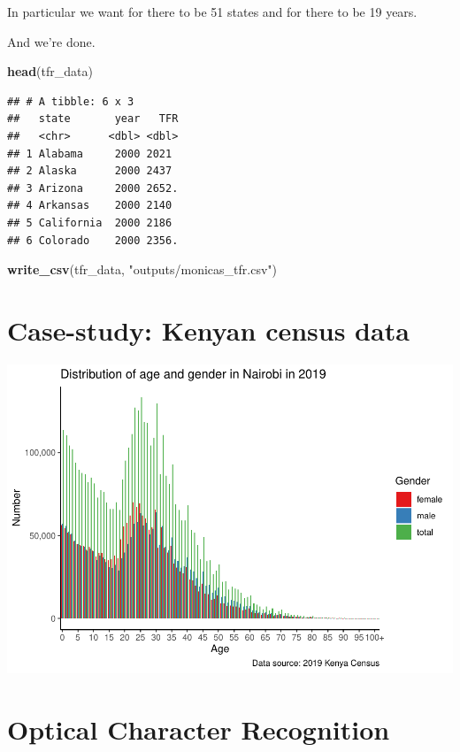 \documentclass[
]{book}
\newenvironment{Shaded}{\begin{snugshade}}{\end{snugshade}}
\newcommand{\KeywordTok}[1]{\textcolor[rgb]{0.13,0.29,0.53}{\textbf{#1}}}
\newcommand{\NormalTok}[1]{#1}
\newcommand{\StringTok}[1]{\textcolor[rgb]{0.31,0.60,0.02}{#1}}
\begin{document}
In particular we want for there to be 51 states and for there to be 19 years.

And we're done.

\begin{Shaded}
\begin{Highlighting}[]
\KeywordTok{head}\NormalTok{(tfr_data)}
\end{Highlighting}
\end{Shaded}

\begin{verbatim}
## # A tibble: 6 x 3
##   state       year   TFR
##   <chr>      <dbl> <dbl>
## 1 Alabama     2000 2021 
## 2 Alaska      2000 2437 
## 3 Arizona     2000 2652.
## 4 Arkansas    2000 2140 
## 5 California  2000 2186 
## 6 Colorado    2000 2356.
\end{verbatim}

\begin{Shaded}
\begin{Highlighting}[]
\KeywordTok{write_csv}\NormalTok{(tfr_data, }\StringTok{"outputs/monicas_tfr.csv"}\NormalTok{)}
\end{Highlighting}
\end{Shaded}

\hypertarget{case-study-kenyan-census-data}{%
\section{Case-study: Kenyan census data}\label{case-study-kenyan-census-data}}


\includegraphics{telling_stories_with_data_files/figure-latex/unnamed-chunk-219-1.pdf}

\hypertarget{optical-character-recognition}{%
\section{Optical Character Recognition}\label{optical-character-recognition}}
\end{document}
